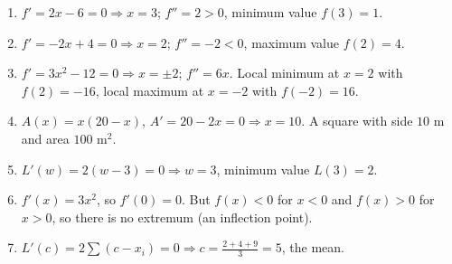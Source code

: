 \begin{enumerate}[label=\textbf{\ansnum.\arabic*}]
  \item $f'=2x-6=0\Rightarrow x=3$; $f''=2>0$, minimum value $f(3)=1$.
  \item $f'=-2x+4=0\Rightarrow x=2$; $f''=-2<0$, maximum value $f(2)=4$.
  \item $f'=3x^2-12=0\Rightarrow x=\pm2$; $f''=6x$. Local minimum at $x=2$ with $f(2)=-16$, local maximum at $x=-2$ with $f(-2)=16$.
  \item $A(x)=x(20-x)$, $A'=20-2x=0\Rightarrow x=10$. A square with side $10$ m and area $100$ m$^2$.
  \item $L'(w)=2(w-3)=0\Rightarrow w=3$, minimum value $L(3)=2$.
  \item $f'(x)=3x^2$, so $f'(0)=0$. But $f(x)<0$ for $x<0$ and $f(x)>0$ for $x>0$, so there is no extremum (an inflection point).
  \item[\textbf{\ansnum.7}] $L'(c)=2\sum(c-x_i)=0\Rightarrow c=\frac{2+4+9}{3}=5$, the mean.
\end{enumerate}
